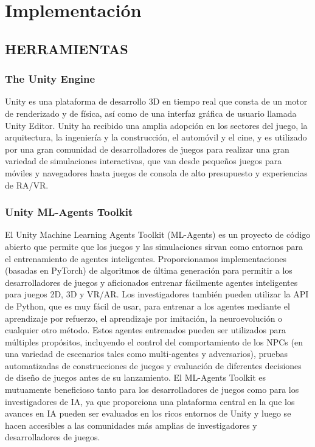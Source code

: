 \chapter{Implementación}\label{chapter:implementation}


\section{HERRAMIENTAS}

\subsection{The Unity Engine}

Unity es una plataforma de desarrollo 3D en tiempo real que consta de un motor de renderizado y de física, así como de una interfaz gráfica de usuario llamada Unity Editor. Unity ha recibido una amplia adopción en los sectores del juego, la arquitectura, la ingeniería y la construcción, el automóvil y el cine, y es utilizado por una gran comunidad de desarrolladores de juegos para realizar una gran variedad de simulaciones interactivas, que van desde pequeños juegos para móviles y navegadores hasta juegos de consola de alto presupuesto y experiencias de RA/VR.

\subsection{Unity ML-Agents Toolkit}



El Unity Machine Learning Agents Toolkit (ML-Agents) es un proyecto de código abierto que permite que los juegos y las simulaciones sirvan como entornos para el entrenamiento de agentes inteligentes. Proporcionamos implementaciones (basadas en PyTorch) de algoritmos de última generación para permitir a los desarrolladores de juegos y aficionados entrenar fácilmente agentes inteligentes para juegos 2D, 3D y VR/AR. Los investigadores también pueden utilizar la API de Python, que es muy fácil de usar, para entrenar a los agentes mediante el aprendizaje por refuerzo, el aprendizaje por imitación, la neuroevolución o cualquier otro método. Estos agentes entrenados pueden ser utilizados para múltiples propósitos, incluyendo el control del comportamiento de los NPCs (en una variedad de escenarios tales como multi-agentes y adversarios), pruebas automatizadas de construcciones de juegos y evaluación de diferentes decisiones de diseño de juegos antes de su lanzamiento. El ML-Agents Toolkit es mutuamente beneficioso tanto para los desarrolladores de juegos como para los investigadores de IA, ya que proporciona una plataforma central en la que los avances en IA pueden ser evaluados en los ricos entornos de Unity y luego se hacen accesibles a las comunidades más amplias de investigadores y desarrolladores de juegos.


